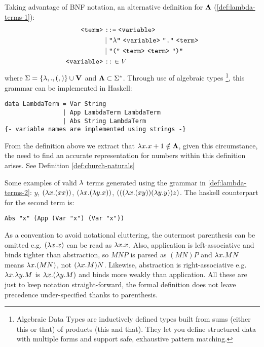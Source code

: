 \documentclass[12pt]{book}
\begin{document}
\begin{definition} Taking advantage of BNF notation, an alternative definition for $\mathbf{\Lambda}$ (\ref{def:lambda-terms-1}):
  \begin{align*}
    \texttt{<term>} &\;\texttt{::=}\; \texttt{<variable>} \\
                    &\;|\; \texttt{"$\la$"}\ \texttt{<variable>}\ \texttt{"."}\ \texttt{<term>} \\
                    &\;|\; \texttt{"("}\ \texttt{<term>}\ \texttt{<term>}\ \texttt{")"} \\
    \texttt{<variable>} &\;\texttt{::}\in V
  \end{align*}
  \label{def:lambda-terms-2}
  where \( \Sigma = \{ \lambda, ., (, )\} \cup \mathbf{V} \) and \( \mathbf{\Lambda} \subset \Sigma^* \). Through use of algebraic types \footnote{Algebraic Data Types are inductively defined types built from sums (either this or that) of products (this and that). They let you define structured data with multiple forms and support safe, exhaustive pattern matching. }, this grammar can be implemented in Haskell:
  \begin{lstlisting}[style=haskellstyle,caption={Grammar implementation of the \lcalc \ language using Haskell's algebraic types}]
data LambdaTerm = Var String
                | App LambdaTerm LambdaTerm
                | Abs String LambdaTerm
{- variable names are implemented using strings -}
  \end{lstlisting}
\end{definition}
\begin{remark}
  From the definition above we extract that \( \lambda x . x + 1 \notin \mathbf{\Lambda} \), given this circumstance, the need to find an accurate representation for numbers within this definition arises. See Definition \ref{def:church-naturals}
\end{remark}
\begin{example} \label{ex:lambda-terms} Some examples of valid $\lambda$ terms generated using the grammar in \ref{def:lambda-terms-2}:
  \( y \),
  \( (\lambda x. (x x)) \),
  \( (\lambda x. (\lambda y. x)) \),
  \( (((\lambda x. (x y)) (\lambda y. y)) z) \).
  The haskell counterpart for the second term is:
  \begin{lstlisting}[style=haskellstyle,caption={Haskell interpretation of the second term}]
Abs "x" (App (Var "x") (Var "x"))
  \end{lstlisting}
\end{example}
As a convention to avoid notational cluttering, the outermost parenthesis can be omitted e.g. $ ( \lambda x.x ) $ can be read as $ \lambda x.x $. Also, application is left-associative  and binds tighter than abstraction, so $M N P$ is parsed as $(M N) P$ and $\lambda x . M N$ means $\lambda x . (M N)$, not $(\lambda x . M) N$. Likewise, abstraction is right-associative e.g. $\lambda x . \lambda y . M$ is $\lambda x . (\lambda y . M)$ and binds more weakly than application. All these are just to keep notation straight-forward, the formal definition does not leave precedence under-specified thanks to parenthesis.
\end{document}
